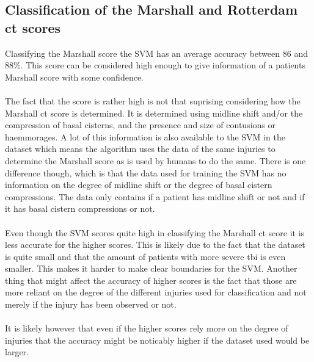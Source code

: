 \documentclass[11pt]{article}
\begin{document}
\subsection{Classification of the Marshall and Rotterdam \gls{ct} scores}
Classifying the Marshall score the SVM has an average accuracy between 86 and 88\%. This score can be considered high enough to give information of a patients Marshall score with some confidence.\\
\\
The fact that the score is rather high is not that suprising considering how the Marshall \gls{ct} score is determined. It is determined using midline shift and/or the compression of basal cisterns, and the presence and size of contusions or haemmorages. A lot of this information is also available to the SVM in the dataset which means the algorithm uses the data of the same injuries to determine the Marshall score as is used by humans to do the same. There is one difference though, which is that the data used for training the SVM has no information on the degree of midline shift or the degree of basal cistern compressions. The data only contains if a patient has midline shift or not and if it has basal cistern compressions or not.\\
\\
Even though the SVM scores quite high in classifying the Marshall \gls{ct} score it is less accurate for the higher scores. This is likely due to the fact that the dataset is quite small and that the amount of patients with more severe \gls{tbi} is even smaller. This makes it harder to make clear boundaries for the SVM. Another thing that might affect the accuracy of higher scores is the fact that those are more reliant on the degree of the different injuries used for classification and not merely if the injury has been observed or not.\\
\\
It is likely however that even if the higher scores rely more on the degree of injuries that the accuracy might be noticably higher if the dataset used would be larger.
\end{document}
